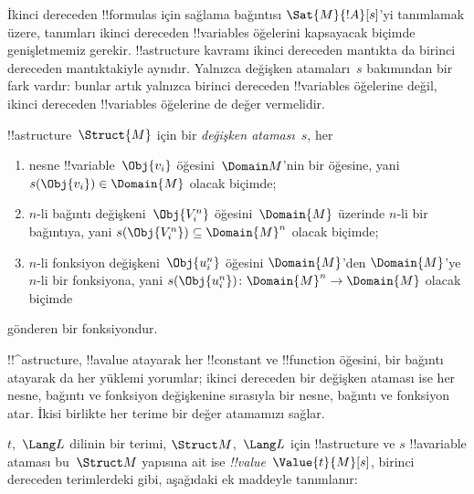 



\begin{explain}
İkinci dereceden !!{formula}s için sağlama bağıntısı $\Sat{M}{!A}[s]$'yi
tanımlamak üzere, tanımları ikinci dereceden !!{variable}s öğelerini
kapsayacak biçimde genişletmemiz gerekir. !!a{structure} kavramı ikinci
dereceden mantıkta da birinci dereceden mantıktakiyle aynıdır. Yalnızca
değişken atamaları~$s$ bakımından bir fark vardır: bunlar artık yalnızca
birinci dereceden !!{variable}s öğelerine değil, ikinci dereceden
!!{variable}s öğelerine de değer vermelidir.
\end{explain}

\begin{defn}
!!a{structure}~$\Struct{M}$ için bir \emph{değişken ataması}~$s$, her
\begin{enumerate}
\item nesne !!{variable}~$\Obj{v_i}$ öğesini~$\Domain M$'nin bir öğesine,
  yani $s(\Obj{v_i}) \in \Domain{M}$ olacak biçimde;
\item $n$-li bağıntı değişkeni~$\Obj{V_i^n}$ öğesini~$\Domain{M}$ üzerinde
  $n$-li bir bağıntıya, yani $s(\Obj{V_i^n}) \subseteq \Domain{M}^n$
  olacak biçimde;
\item $n$-li fonksiyon değişkeni~$\Obj{u_i^n}$ öğesini $\Domain{M}$'den
  $\Domain{M}$'ye $n$-li bir fonksiyona, yani
  $s(\Obj{u_i^n})\colon \Domain{M}^n \to \Domain{M}$ olacak biçimde
\end{enumerate}
gönderen bir fonksiyondur.
\end{defn}

\begin{explain}
!!^a{structure}, !!a{value} atayarak her !!{constant} ve !!{function}
öğesini, bir bağıntı atayarak da her yüklemi yorumlar; ikinci dereceden bir değişken ataması ise her
nesne, bağıntı ve fonksiyon değişkenine sırasıyla bir nesne, bağıntı ve
fonksiyon atar. İkisi birlikte her terime bir değer atamamızı sağlar.
\end{explain}

\begin{defn}
$t$,~$\Lang L$ dilinin bir terimi, $\Struct M$,~$\Lang L$ için
!!a{structure} ve $s$ !!a{variable} ataması bu~$\Struct M$ yapısına ait ise
\emph{!!{value}}~$\Value{t}{M}[s]$, birinci dereceden terimlerdeki gibi,
aşağıdaki ek maddeyle tanımlanır:
\begin{quote}
\end{quote}
\end{defn}

